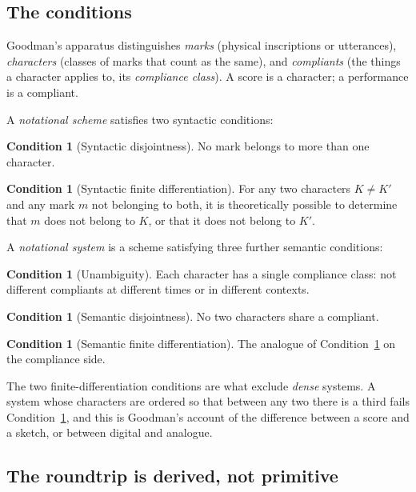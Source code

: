 \documentclass[11pt,a4paper]{article}
\theoremstyle{definition}
\newtheorem{condition}[definition]{Condition}
\theoremstyle{plain}
\theoremstyle{remark}
\begin{document}
\subsection{The conditions}

Goodman's apparatus distinguishes \emph{marks} (physical inscriptions or utterances),
\emph{characters} (classes of marks that count as the same), and \emph{compliants} (the
things a character applies to, its \emph{compliance class}). A score is a character; a
performance is a compliant.

A \emph{notational scheme} satisfies two syntactic conditions:

\begin{condition}[Syntactic disjointness]
\label{cond:sd}
No mark belongs to more than one character.
\end{condition}

\begin{condition}[Syntactic finite differentiation]
\label{cond:sfd}
For any two characters $K \neq K'$ and any mark $m$ not belonging to both, it is
theoretically possible to determine that $m$ does not belong to $K$, or that it does not
belong to $K'$.
\end{condition}

\noindent A \emph{notational system} is a scheme satisfying three further semantic
conditions:

\begin{condition}[Unambiguity]
\label{cond:ua}
Each character has a single compliance class: not different compliants at different times
or in different contexts.
\end{condition}

\begin{condition}[Semantic disjointness]
\label{cond:semd}
No two characters share a compliant.
\end{condition}

\begin{condition}[Semantic finite differentiation]
\label{cond:semfd}
The analogue of Condition~\ref{cond:sfd} on the compliance side.
\end{condition}

\noindent The two finite-differentiation conditions are what exclude \emph{dense} systems.
A system whose characters are ordered so that between any two there is a third fails
Condition~\ref{cond:sfd}, and this is Goodman's account of the difference between a score
and a sketch, or between digital and analogue.

\subsection{The roundtrip is derived, not primitive}
\end{document}
